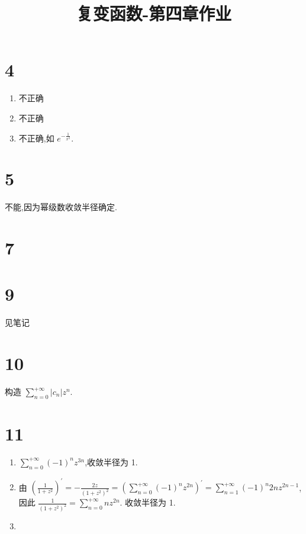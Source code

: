 
\usepackage{../../homeworks_preamble}
\title{复变函数-第四章作业}


    \maketitle
    \section{4}
    \begin{enumerate}
        \item 不正确
        \item 不正确
        \item 不正确,如 $e^{-\frac{1}{x^2}}$.
    \end{enumerate}
    \section{5}
        
        不能,因为幂级数收敛半径确定.
    \section{7}
    \section{9}
        见笔记
    \section{10}
        构造 $\sum_{n=0}^{+\infty}|c_{n}|z^{n}$.
    \section{11}
    \begin{enumerate}
        \item $\sum_{n=0}^{+\infty}(-1)^{n}z^{3n}$,收敛半径为 1.
        \item 由 $\left(\frac{1}{1+z^2}\right)^{'}=-\frac{2z}{(1+z^2)^2}=(\sum_{n=0}^{+\infty}(-1)^{n}z^{2n})^{'}=\sum_{n=1}^{+\infty}(-1)^{n}2nz^{2n-1}$,因此 $\frac{1}{(1+z^2)^2}=\sum_{n=0}^{+\infty}nz^{2n}$. 收敛半径为 1.
        \item 
    \end{enumerate}

